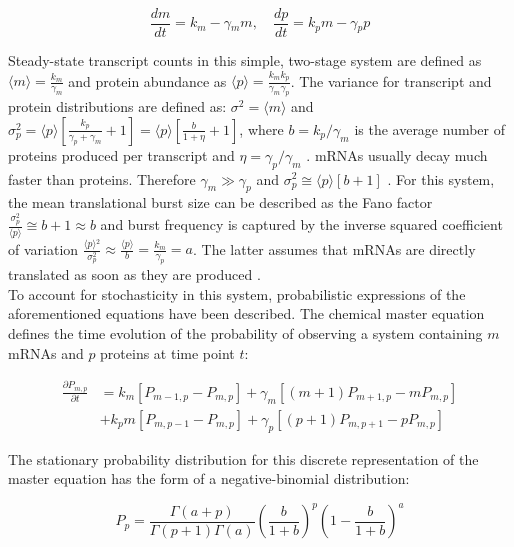 \begin{equation}
\frac{dm}{dt}=k_m-\gamma{}_mm,\quad \frac{dp}{dt}=k_pm-\gamma{}_pp
\end{equation}

\doublespacing
\noindent Steady-state transcript counts in this simple, two-stage system are defined as $\langle{}m\rangle{}=\frac{k_m}{\gamma_m}$  and protein abundance as $\langle{}p\rangle{}=\frac{k_mk_p}{\gamma_m\gamma_p }$. 
The variance for transcript and protein distributions are defined as: $\sigma^2=\langle{}m\rangle{}$ and $\sigma_p^2=\langle{}p\rangle{}\left[\frac{k_p}{\gamma_p+\gamma_m}+1\right]=\langle{}p\rangle{}\left[\frac{b}{1+\eta}+1\right]$, where $b=k_p/\gamma_m$  is the average number of proteins produced per transcript and $\eta=\gamma_p/\gamma_m$  \citep{Tsimring2014, Thattai2001}. 
mRNAs usually decay much faster than proteins. Therefore $\gamma_m\gg{}\gamma_p$ and $\sigma_p^2\cong\langle{}p\rangle{}\left[b+1\right]$ \citep{Thattai2001}. 
For this system, the mean translational burst size can be described as the Fano factor $\frac{\sigma_p^2}{\langle{}p\rangle}\cong{}b+1\approx{}b$ and burst frequency is captured by the inverse squared coefficient of variation $\frac{\langle{}p\rangle{}^2}{\sigma_p^2}\approx{}\frac{\langle{}p\rangle{}}{b}=\frac{k_m}{\gamma_p}=a$. 
The latter assumes that mRNAs are directly translated as soon as they are produced \citep{Friedman2006}.\\

\onehalfspacing
\noindent To account for stochasticity in this system, probabilistic expressions of the aforementioned equations have been described. 
The chemical master equation defines the time evolution of the probability of observing a system containing $m$ mRNAs and $p$ proteins at time point $t$:

\begin{align}
\frac{\partial{}P_{m,p}}{\partial{}t}&=k_m\left[P_{m-1,p}-P_{m,p}\right]+\gamma_m\left[(m+1)P_{m+1,p}-mP_{m,p}\right] \nonumber \\
&+k_pm\left[P_{m,p-1}-P_{m,p}\right]+\gamma_p\left[(p+1)P_{m,p+1}-pP_{m,p}\right]
\end{align}

\noindent The stationary probability distribution for this discrete representation of the master equation has the form of a negative-binomial distribution:

\begin{equation}
P_p=\frac{\Gamma(a+p)}{\Gamma(p+1)\Gamma(a)}\left(\frac{b}{1+b}\right)^p\left(1-\frac{b}{1+b}\right)^a
\end{equation}

